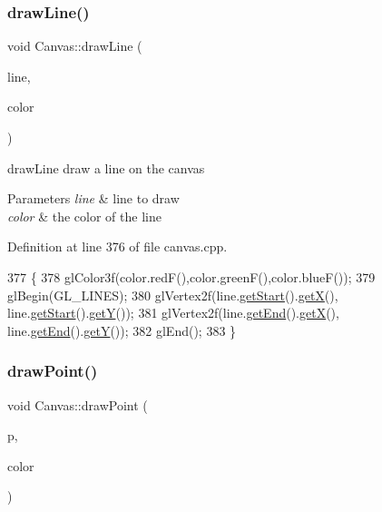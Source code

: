 \subsubsection{\texorpdfstring{draw\+Line()}{drawLine()}}
{\footnotesize\ttfamily void Canvas\+::draw\+Line (\begin{DoxyParamCaption}\item[{\hyperlink{class_line_segment}{Line\+Segment}}]{line,  }\item[{Q\+Color}]{color }\end{DoxyParamCaption})\hspace{0.3cm}{\ttfamily [private]}}



draw\+Line draw a line on the canvas 


\begin{DoxyParams}{Parameters}
{\em line} & line to draw \\
\hline
{\em color} & the color of the line \\
\hline
\end{DoxyParams}


Definition at line 376 of file canvas.\+cpp.


\begin{DoxyCode}
377 \{
378     glColor3f(color.redF(),color.greenF(),color.blueF());
379     glBegin(GL\_LINES);
380     glVertex2f(line.\hyperlink{class_line_segment_afcff6bd5f6a3073a44f7b21db0be876f}{getStart}().\hyperlink{class_point_a29c44ec7c7279e02629645a06cdaf7d5}{getX}(), line.\hyperlink{class_line_segment_afcff6bd5f6a3073a44f7b21db0be876f}{getStart}().\hyperlink{class_point_a2371ffadbe245d12a8f556d0a976521b}{getY}());
381     glVertex2f(line.\hyperlink{class_line_segment_a7b05f883c369b950e61009edfafbbd0e}{getEnd}().\hyperlink{class_point_a29c44ec7c7279e02629645a06cdaf7d5}{getX}(), line.\hyperlink{class_line_segment_a7b05f883c369b950e61009edfafbbd0e}{getEnd}().\hyperlink{class_point_a2371ffadbe245d12a8f556d0a976521b}{getY}());
382     glEnd();
383 \}
\end{DoxyCode}
\mbox{\label{class_canvas_ad7cf8e6e93765586808ac744d888dbdc}} 
\subsubsection{\texorpdfstring{draw\+Point()}{drawPoint()}}
{\footnotesize\ttfamily void Canvas\+::draw\+Point (\begin{DoxyParamCaption}\item[{\hyperlink{class_point}{Point}}]{p,  }\item[{Q\+Color}]{color }\end{DoxyParamCaption})\hspace{0.3cm}{\ttfamily [private]}}




